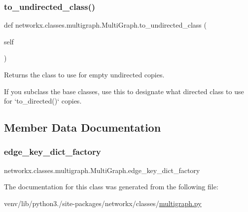 \subsubsection{\texorpdfstring{to\+\_\+undirected\+\_\+class()}{to\_undirected\_class()}}
{\footnotesize\ttfamily def networkx.\+classes.\+multigraph.\+Multi\+Graph.\+to\+\_\+undirected\+\_\+class (\begin{DoxyParamCaption}\item[{}]{self }\end{DoxyParamCaption})}

\begin{DoxyVerb}Returns the class to use for empty undirected copies.

If you subclass the base classes, use this to designate
what directed class to use for `to_directed()` copies.
\end{DoxyVerb}
 

\subsection{Member Data Documentation}
\mbox{\label{classnetworkx_1_1classes_1_1multigraph_1_1MultiGraph_a2ef3b68f7d053dbb60fe26faca6ccb1e}} 
\subsubsection{\texorpdfstring{edge\+\_\+key\+\_\+dict\+\_\+factory}{edge\_key\_dict\_factory}}
{\footnotesize\ttfamily networkx.\+classes.\+multigraph.\+Multi\+Graph.\+edge\+\_\+key\+\_\+dict\+\_\+factory\hspace{0.3cm}{\ttfamily [static]}}



The documentation for this class was generated from the following file\+:\begin{DoxyCompactItemize}
\item 
venv/lib/python3./site-\/packages/networkx/classes/\hyperlink{multigraph_8py}{multigraph.\+py}\end{DoxyCompactItemize}
